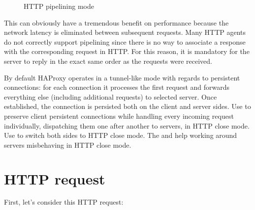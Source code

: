\begin{figure}[!ht]
\centering
{}

\caption{HTTP pipelining mode}
\label{fig:http_pipelining}
\end{figure}

This can obviously have a tremendous benefit on performance because the network
latency is eliminated between subsequent requests. Many HTTP agents do not
correctly support pipelining since there is no way to associate a response with
the corresponding request in HTTP. For this reason, it is mandatory for the
server to reply in the exact same order as the requests were received.

By default HAProxy operates in a tunnel-like mode with regards to persistent
connections: for each connection it processes the first request and forwards
everything else (including additional requests) to selected server. Once
established, the connection is persisted both on the client and server
sides. Use  to preserve client persistent connections
while handling every incoming request individually, dispatching them one after
another to servers, in HTTP close mode. Use  to switch both
sides to HTTP close mode. The  and  help working around servers misbehaving in HTTP close
mode.

\section{HTTP request}
\label{sec:http_request}

First, let's consider this HTTP request:

